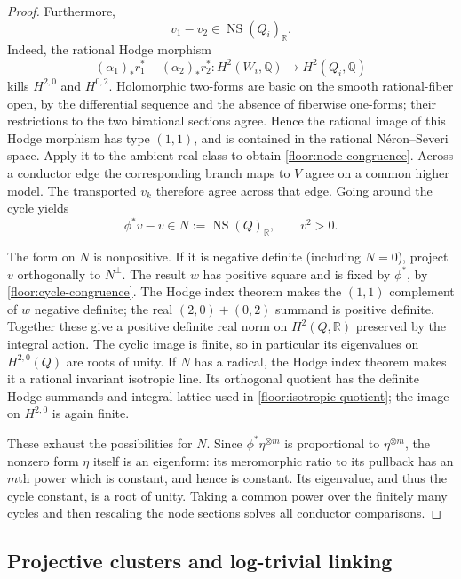 \documentclass[11pt,letterpaper]{article}
\theoremstyle{definition}
\theoremstyle{remark}
\begin{document}
\begin{proof}
Furthermore,
\begin{equation}
 \label{floor:node-congruence}
 v_1-v_2\in\operatorname{NS}(Q_i)_\mathbb{R}.
\end{equation}
Indeed, the rational Hodge morphism
\[
 (\alpha_1)_*r_1^*-(\alpha_2)_*r_2^*
 :H^2(W_i,\mathbb{Q})\longrightarrow H^2(Q_i,\mathbb{Q})
\]
kills $H^{2,0}$ and $H^{0,2}$.  Holomorphic two-forms are
basic on the smooth rational-fiber open, by the differential
sequence and the absence of fiberwise one-forms; their
restrictions to the two birational sections agree.  Hence
the rational image of this Hodge morphism has type $(1,1)$,
and is contained in the rational N\'eron--Severi space.
Apply it to the ambient real class to obtain
\eqref{floor:node-congruence}.  Across a conductor edge the
corresponding branch maps to $V$ agree on a common higher
model.  The transported $v_k$ therefore agree across that
edge.  Going around the cycle yields
\begin{equation}
 \label{floor:cycle-congruence}
 \phi^*v-v\in N:=\operatorname{NS}(Q)_\mathbb{R},\qquad v^2>0.
\end{equation}

The form on $N$ is nonpositive.  If it is negative definite
(including $N=0$), project $v$ orthogonally to $N^\perp$.
The result $w$ has positive square and is fixed by $\phi^*$,
by \eqref{floor:cycle-congruence}.  The Hodge index theorem
makes the $(1,1)$ complement of $w$ negative definite;
the real $(2,0)+(0,2)$ summand is positive definite.
Together these give a positive definite real norm on
$H^2(Q,\mathbb{R})$ preserved by the integral action.  The cyclic
image is finite, so in particular its eigenvalues on
$H^{2,0}(Q)$ are roots of unity.  If $N$ has a radical,
the Hodge index theorem makes it a rational invariant
isotropic line.  Its orthogonal quotient has the definite
Hodge summands and integral lattice used in
\eqref{floor:isotropic-quotient}; the image on $H^{2,0}$
is again finite.

These exhaust the possibilities for $N$.  Since
$\phi^*\eta^{\otimes m}$ is proportional to
$\eta^{\otimes m}$, the nonzero form $\eta$ itself is an
eigenform: its meromorphic ratio to its pullback has an
$m$th power which is constant, and hence is constant.
Its eigenvalue, and thus the cycle constant, is a root of
unity.  Taking a common power over the finitely many
cycles and then rescaling the node sections solves all
conductor comparisons.
\end{proof}

\subsection{Projective clusters and log-trivial linking}
\end{document}
